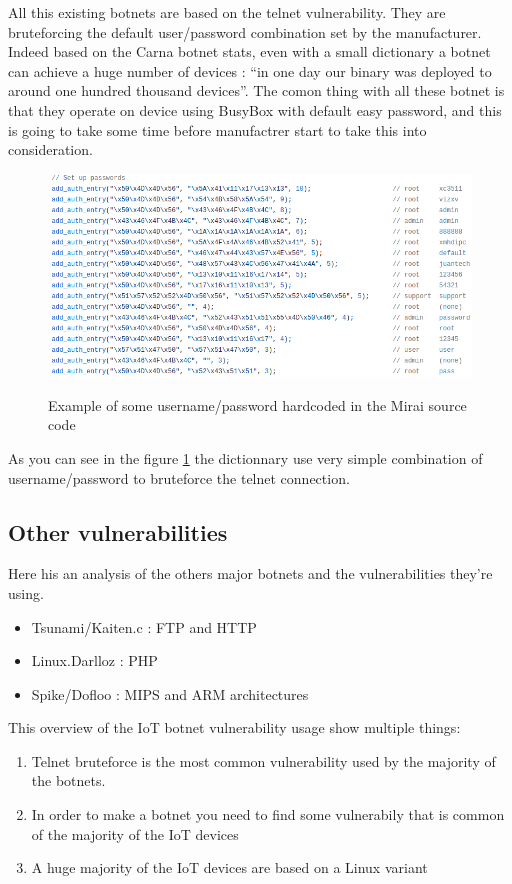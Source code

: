 \documentclass{report}
\begin{document}
All this existing botnets are based on the telnet vulnerability. They are bruteforcing the default user/password combination set by the manufacturer. Indeed based on the Carna botnet \autocite{carna} stats, even with a small dictionary a botnet can achieve a huge number of devices : ``in one day our binary was deployed to around one hundred thousand devices''.
The comon thing with all these botnet is that they operate on device using BusyBox with default easy password, and this is going to take some time before manufactrer start to take this into consideration.\newline
\begin{figure}[h]
 \caption{Example of some username/password hardcoded in the Mirai source code}
 \centering
 \includegraphics[width=1.2\textwidth]{./img/mirai-dict}
 \label{fig:mirai-dict}
\end{figure}
As you can see in the figure \ref{fig:mirai-dict} the dictionnary use very simple combination of username/password to bruteforce the telnet connection.

\subsection{Other vulnerabilities}
Here his an analysis of the others major botnets and the vulnerabilities they're using.

\begin{itemize}
 \item Tsunami/Kaiten.c \autocite{tsunami} : FTP and HTTP
 \item Linux.Darlloz \autocite{darlloz} : PHP
 \item Spike/Dofloo \autocite{spike} : MIPS and ARM architectures
\end{itemize}

This overview of the IoT botnet vulnerability usage show multiple things:
\begin{enumerate}
 \item Telnet bruteforce is the most common vulnerability used by the majority of the botnets.
 \item In order to make a botnet you need to find some vulnerabily that is common of the majority of the IoT devices
 \item A huge majority of the IoT devices are based on a Linux variant
\end{enumerate}
\end{document}
